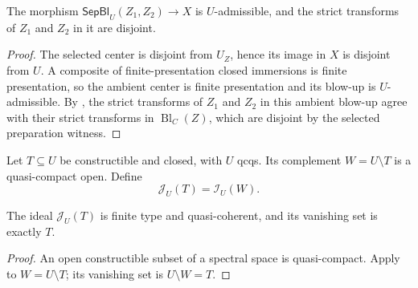 \begin{lemma}
  \label{lemma:nagata-separate-closed-subschemes}

  The morphism $\mathsf{SepBl}_U(Z_1,Z_2)\to X$ is $U$-admissible, and the
  strict transforms of $Z_1$ and $Z_2$ in it are disjoint.
\end{lemma}

\begin{proof}
  The selected center is disjoint from $U_Z$, hence its image in $X$ is
  disjoint from $U$.  A composite of finite-presentation closed immersions is
  finite presentation, so the ambient center is finite presentation and its
  blow-up is $U$-admissible.  By
  , the strict transforms
  of $Z_1$ and $Z_2$ in this ambient blow-up agree with their strict
  transforms in $\operatorname{Bl}_C(Z)$, which are disjoint by the selected
  preparation witness.
\end{proof}

\begin{definition}
  \label{def:nagata-constructible-closed-support}

  Let $T\subseteq U$ be constructible and closed, with $U$ qcqs.  Its
  complement $W=U\setminus T$ is a quasi-compact open.  Define
  \[
    \mathcal J_U(T)=\mathcal I_U(W).
  \]
\end{definition}

\begin{lemma}
  \label{lemma:nagata-constructible-closed-support}

  The ideal $\mathcal J_U(T)$ is finite type and quasi-coherent, and its
  vanishing set is exactly $T$.
\end{lemma}

\begin{proof}
  An open constructible subset of a spectral space is quasi-compact.  Apply
   to $W=U\setminus T$; its
  vanishing set is $U\setminus W=T$.
\end{proof}

